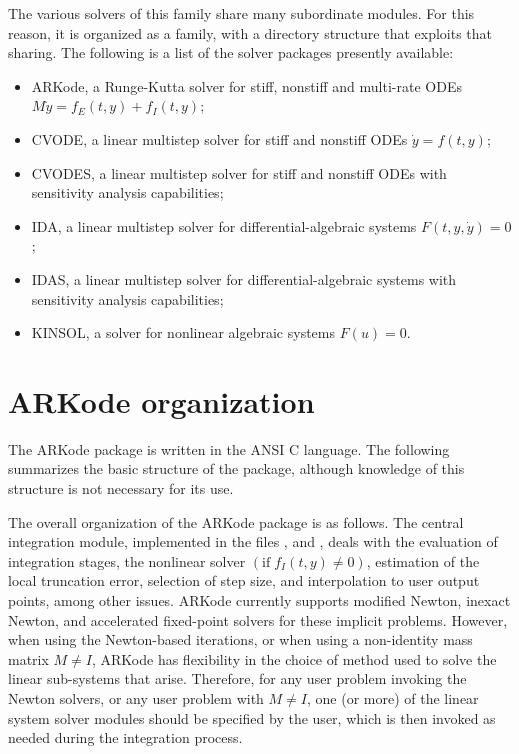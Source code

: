 \documentclass[letterpaper,10pt,english]{sphinxmanual}
\begin{document}
The various solvers of this family share many subordinate modules.
For this reason, it is organized as a family, with a directory
structure that exploits that sharing.  The following is a list of the
solver packages presently available:
\begin{itemize}
\item {} 
ARKode, a Runge-Kutta solver for stiff, nonstiff and multi-rate ODEs
$M \dot{y} = f_E(t,y) + f_I(t,y)$;

\item {} 
CVODE, a linear multistep solver for stiff and nonstiff ODEs
$\dot{y} = f(t,y)$;

\item {} 
CVODES, a linear multistep solver for stiff and nonstiff ODEs with
sensitivity analysis capabilities;

\item {} 
IDA, a linear multistep solver for differential-algebraic systems
$F(t,y,\dot{y}) = 0$;

\item {} 
IDAS, a linear multistep solver for differential-algebraic systems with sensitivity
analysis capabilities;

\item {} 
KINSOL, a solver for nonlinear algebraic systems $F(u) = 0$.

\end{itemize}


\section{ARKode organization}
\label{Organization:arkode-organization}
The ARKode package is written in the ANSI C language.  The
following summarizes the basic structure of the package, although
knowledge of this structure is not necessary for its use.

The overall organization of the ARKode package is as follows.  The
central integration module, implemented in the files ,
 and , deals with the evaluation of
integration stages, the nonlinear solver $(\text{if}\;
f_I(t,y)\ne 0)$, estimation of the local truncation error, selection
of step size, and interpolation to user output points, among other
issues.  ARKode currently supports modified Newton, inexact Newton, and
accelerated fixed-point solvers for these implicit problems.  However,
when using the Newton-based iterations, or when using a non-identity
mass matrix $M\ne I$, ARKode has flexibility in the choice of
method used to solve the linear sub-systems that arise.  Therefore,
for any user problem invoking the Newton solvers, or any user problem
with $M\ne I$, one (or more) of the linear system solver modules
should be specified by the user, which is then invoked as needed
during the integration process.
\end{document}
